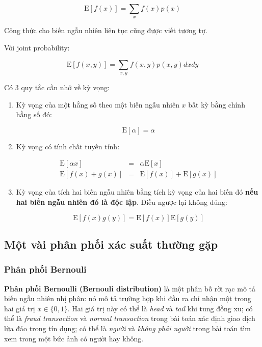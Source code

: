\documentclass[../main-report.tex]{subfiles}
\begin{document}
\begin{equation}
	\text{E}[f(x)] = \sum_x f(x) p(x)
\end{equation}

Công thức cho biến ngẫu nhiên liên tục cũng được viết tương tự.

Với joint probability:

\begin{equation}
\text{E}[f(x, y)] = \sum_{x,y} f(x, y) p(x, y) dx dy
\end{equation}

Có 3 quy tắc cần nhớ về kỳ vọng:

\begin{enumerate}
\item Kỳ vọng của một hằng số theo một biến ngẫu nhiên \(x\) bất kỳ bằng chính hằng số đó:

\begin{equation}
\text{E}[\alpha] = \alpha
\end{equation}

\item Kỳ vọng có tính chất tuyến tính:

\begin{eqnarray}
  \text{E}[\alpha x] & = & \alpha \text{E}[x] \quad \\
  \text{E}[f(x) + g(x)] & = & \text{E}[f(x)] + \text{E}[g(x)]
\end{eqnarray}

\item Kỳ vọng của tích hai biến ngẫu nhiên bằng tích kỳ vọng của hai biến đó \textbf{nếu hai biến ngẫu nhiên đó là độc lập}. Điều ngược lại không đúng:

\begin{equation}
\text{E}[f(x) g(y)] = \text{E}[f(x)] \text{E}[g(y)]
\end{equation}

\end{enumerate}
\subsection{Một vài phân phối xác suất thường gặp}
\subsubsection*{Phân phối Bernouli}
\textbf{Phân phối Bernoulli (Bernouli distribution)} là một phân bố rời rạc mô tả biến ngẫu nhiên nhị phân: nó mô tả trường hợp khi đầu ra chỉ nhận một trong hai giá trị \(x \in \{0, 1\}\). Hai giá trị này có thể là \emph{head} và \emph{tail} khi tung đồng xu; có thể là \emph{fraud transaction} và \emph{normal transaction} trong bài toán xác định giao dịch lừa đảo trong tín dụng; có thể là \emph{người} và \emph{không phải người} trong bài toán tìm xem trong một bức ảnh có người hay không.
\end{document}
